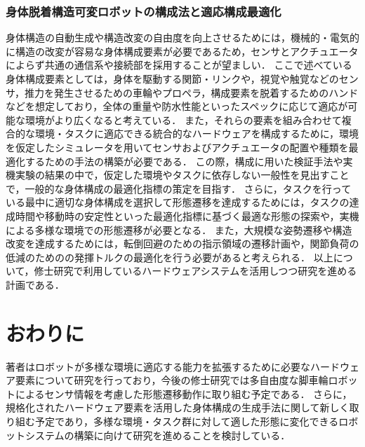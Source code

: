 \documentclass[twocolumn]{d-abst}
\begin{document}
\subsubsection{身体脱着構造可変ロボットの構成法と適応構成最適化}
身体構造の自動生成や構造改変の自由度を向上させるためには，機械的・電気的に構造の改変が容易な身体構成要素が必要であるため，センサとアクチュエータによらず共通の通信系や接続部を採用することが望ましい．
ここで述べている身体構成要素としては，身体を駆動する関節・リンクや，視覚や触覚などのセンサ，推力を発生させるための車輪やプロペラ，構成要素を脱着するためのハンドなどを想定しており，全体の重量や防水性能といったスペックに応じて適応が可能な環境がより広くなると考えている．
また，それらの要素を組み合わせて複合的な環境・タスクに適応できる統合的なハードウェアを構成するために，環境を仮定したシミュレータを用いてセンサおよびアクチュエータの配置や種類を最適化するための手法の構築が必要である．
この際，構成に用いた検証手法や実機実験の結果の中で，仮定した環境やタスクに依存しない一般性を見出すことで，一般的な身体構成の最適化指標の策定を目指す．
さらに，タスクを行っている最中に適切な身体構成を選択して形態遷移を達成するためには，タスクの達成時間や移動時の安定性といった最適化指標に基づく最適な形態の探索や，実機による多様な環境での形態遷移が必要となる．
また，大規模な姿勢遷移や構造改変を達成するためには，転倒回避のための指示領域の遷移計画や，関節負荷の低減のためのの発揮トルクの最適化を行う必要があると考えられる．
以上について，修士研究で利用しているハードウェアシステムを活用しつつ研究を進める計画である．

\section{おわりに}
著者はロボットが多様な環境に適応する能力を拡張するために必要なハードウェア要素について研究を行っており，今後の修士研究では多自由度な脚車輪ロボットによるセンサ情報を考慮した形態遷移動作に取り組む予定である．
さらに，規格化されたハードウェア要素を活用した身体構成の生成手法に関して新しく取り組む予定であり，多様な環境・タスク群に対して適した形態に変化できるロボットシステムの構築に向けて研究を進めることを検討している．



\end{document}
